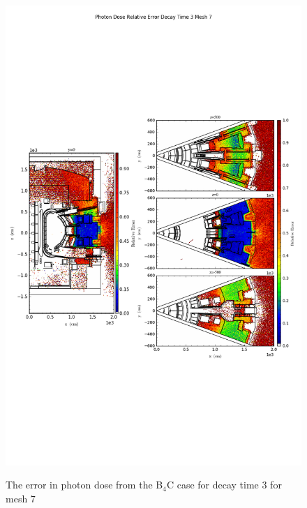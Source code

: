 \begin{figure}[ht!]
\centering
\includegraphics[trim={0cm 9cm 0cm 10cm},clip,scale=0.75]{../plots/final_model_nob4c/Photon_Dose_Relative_Error_Decay_Time_3_Mesh_7.png}
\label{fig:photons_dc3_no4bc_m7_error}
\caption{The error in photon dose from the B$_4$C case for decay time 3 for mesh 7}
\end{figure}
